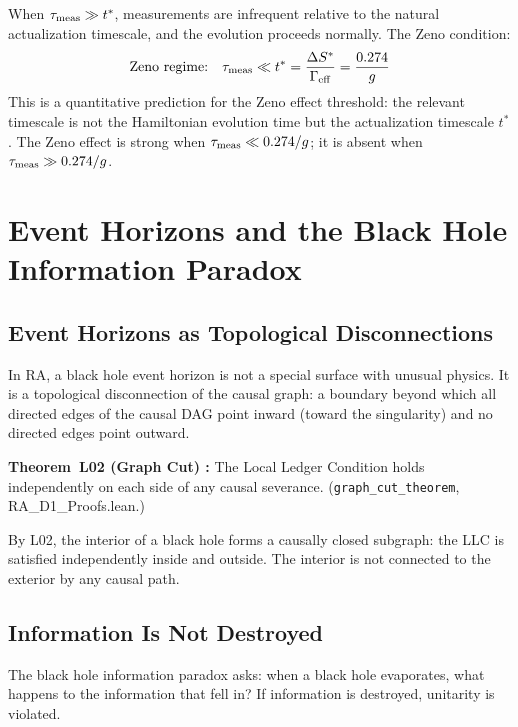 \documentclass[12pt,a4paper]{article}
\begin{document}
When $\tau_{\rm meas}\gg t^*$, measurements are infrequent relative to the natural actualization timescale, and the evolution proceeds normally.  The Zeno condition:
\begin{equation}
  \text{Zeno regime:}\quad \tau_{\rm meas} \ll t^* = \frac{\Delta S^*}{\Gamma_{\rm eff}} = \frac{0.274}{g}
  \label{eq:zeno}
\end{equation}
This is a quantitative prediction for the Zeno effect threshold: the relevant timescale is not the Hamiltonian evolution time but the actualization timescale $t^*$.  The Zeno effect is strong when $\tau_{\rm meas}\ll0.274/g$; it is absent when $\tau_{\rm meas}\gg0.274/g$.

\section{Event Horizons and the Black Hole Information Paradox}\label{sec:horizons}

\subsection{Event Horizons as Topological Disconnections}

In RA, a black hole event horizon is not a special surface with unusual physics.  It is a topological disconnection of the causal graph: a boundary beyond which all directed edges of the causal DAG point inward (toward the singularity) and no directed edges point outward.

\begin{leanbox}
\textbf{Theorem~L02 (Graph Cut) \statusLV:}
The Local Ledger Condition holds independently on each side of any causal severance.  (\texttt{graph\_cut\_theorem}, RA\_D1\_Proofs.lean.)
\end{leanbox}

By L02, the interior of a black hole forms a causally closed subgraph: the LLC is satisfied independently inside and outside.  The interior is not connected to the exterior by any causal path.

\subsection{Information Is Not Destroyed}

The black hole information paradox \cite{Hawking1976} asks: when a black hole evaporates, what happens to the information that fell in?  If information is destroyed, unitarity is violated.
\end{document}
